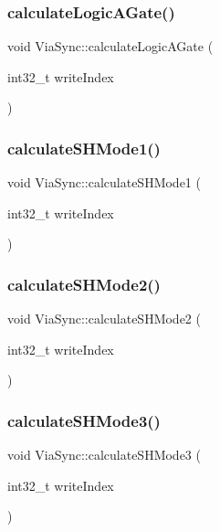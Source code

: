 \subsubsection{\texorpdfstring{calculate\+Logic\+A\+Gate()}{calculateLogicAGate()}}
{\footnotesize\ttfamily void Via\+Sync\+::calculate\+Logic\+A\+Gate (\begin{DoxyParamCaption}\item[{int32\+\_\+t}]{write\+Index }\end{DoxyParamCaption})}

\mbox{\label{class_via_sync_abdb8461ced79404e76aa4150b45f8a10}} 
\subsubsection{\texorpdfstring{calculate\+S\+H\+Mode1()}{calculateSHMode1()}}
{\footnotesize\ttfamily void Via\+Sync\+::calculate\+S\+H\+Mode1 (\begin{DoxyParamCaption}\item[{int32\+\_\+t}]{write\+Index }\end{DoxyParamCaption})}

\mbox{\label{class_via_sync_abc24bde577af46a0788d9df853867f06}} 
\subsubsection{\texorpdfstring{calculate\+S\+H\+Mode2()}{calculateSHMode2()}}
{\footnotesize\ttfamily void Via\+Sync\+::calculate\+S\+H\+Mode2 (\begin{DoxyParamCaption}\item[{int32\+\_\+t}]{write\+Index }\end{DoxyParamCaption})}

\mbox{\label{class_via_sync_a91ecdc9caf9426271a0e28d9be0d8588}} 
\subsubsection{\texorpdfstring{calculate\+S\+H\+Mode3()}{calculateSHMode3()}}
{\footnotesize\ttfamily void Via\+Sync\+::calculate\+S\+H\+Mode3 (\begin{DoxyParamCaption}\item[{int32\+\_\+t}]{write\+Index }\end{DoxyParamCaption})}

